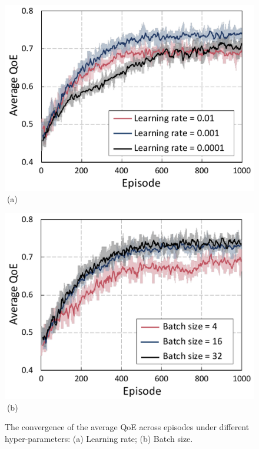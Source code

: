 \documentclass[12pt,draftclsnofoot,onecolumn]{IEEEtran}
\begin{document}
\begin{figure}
	\centering
	\captionsetup{name=Fig.}
	\begin{minipage}[b]{0.34\linewidth}
		\centering
		\includegraphics[width=\textwidth]{Fig/conv1_f} 
		\textcolor{white}{i}\hspace{0.4cm}(a)
	\end{minipage}
	\hspace{-0.26cm}
	\begin{minipage}[b]{0.4\linewidth}
		\centering
		\includegraphics[width=\textwidth]{Fig/conv2_f}
		\textcolor{white}{i}\hspace{0.4cm}(b)
	\end{minipage}
	\vspace{-0.65cm}
	\caption{The convergence of the average QoE across episodes under different hyper-parameters: (a) Learning rate; (b) Batch size.}
	\label{chart0}
\end{figure}
\end{document}
